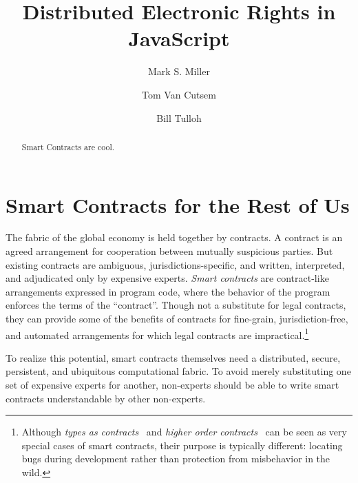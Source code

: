 \documentclass{llncs}
\begin{document}
\sloppypar


\title{Distributed Electronic Rights in JavaScript}

\author{Mark S. Miller \and Tom Van Cutsem \and Bill Tulloh }


\maketitle    

\begin{abstract}

Smart Contracts are cool. 

\end{abstract}


\section{Smart Contracts for the Rest of Us}

The fabric of the global economy is held together by contracts. A contract is an agreed arrangement for cooperation between mutually suspicious parties. But existing contracts are ambiguous, jurisdictions-specific, and written, interpreted, and adjudicated only by expensive experts. \emph{Smart contracts} are contract-like arrangements expressed in program code, where the behavior of the program enforces the terms of the ``contract''\cite{szabo1997formalizing}. Though not a substitute for legal contracts, they can provide some of the benefits of contracts for fine-grain, jurisdiction-free, and automated arrangements for which legal contracts are impractical.\footnote{
%
Although \emph{types as contracts}~\cite{DBLP:journals/computer/Meyer92} and \emph{higher order contracts}~\cite{findler2002contracts} can be seen as very special cases of smart contracts, their purpose is typically different: locating bugs during development rather than protection from misbehavior in the wild.}

To realize this potential, smart contracts themselves need a distributed, secure, persistent, and ubiquitous computational fabric. To avoid merely substituting one set of expensive experts for another, non-experts should be able to write smart contracts understandable by other non-experts.
\end{document}

